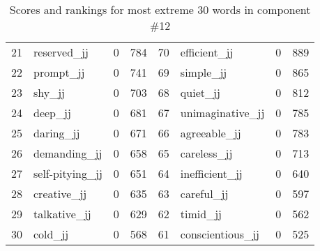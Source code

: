 \begin{table}[tbp]
\begin{tabular}{| rlr@{.}l | rlr@{.}l |}
    21 & reserved\_jj & 0 & 784    &    70 & efficient\_jj & 0 & 889 \\
    22 & prompt\_jj & 0 & 741    &    69 & simple\_jj & 0 & 865 \\
    23 & shy\_jj & 0 & 703    &    68 & quiet\_jj & 0 & 812 \\
    24 & deep\_jj & 0 & 681    &    67 & unimaginative\_jj & 0 & 785 \\
    25 & daring\_jj & 0 & 671    &    66 & agreeable\_jj & 0 & 783 \\
    26 & demanding\_jj & 0 & 658    &    65 & careless\_jj & 0 & 713 \\
    27 & self-pitying\_jj & 0 & 651    &    64 & inefficient\_jj & 0 & 640 \\
    28 & creative\_jj & 0 & 635    &    63 & careful\_jj & 0 & 597 \\
    29 & talkative\_jj & 0 & 629    &    62 & timid\_jj & 0 & 562 \\
    30 & cold\_jj & 0 & 568    &    61 & conscientious\_jj & 0 & 525 \\
    \hline
    \end{tabular}
    \caption{Scores and rankings for most extreme 30 words in component \#12} 
\end{table}
\clearpage
